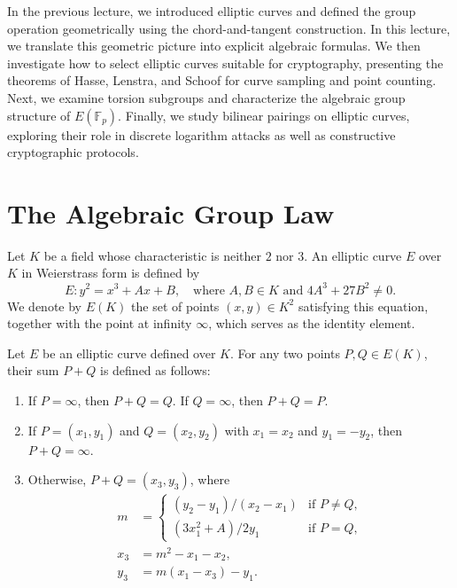 
In the previous lecture, we introduced elliptic curves and defined the group operation geometrically using the chord-and-tangent construction.
In this lecture, we translate this geometric picture into explicit algebraic formulas.
We then investigate how to select elliptic curves suitable for cryptography, presenting the theorems of Hasse, Lenstra, and Schoof for curve sampling and point counting.
Next, we examine torsion subgroups and characterize the algebraic group structure of \(E(\mathbb{F}_p)\).
Finally, we study bilinear pairings on elliptic curves, exploring their role in discrete logarithm attacks as well as constructive cryptographic protocols.

\section*{The Algebraic Group Law}

Let \(K\) be a field whose characteristic is neither \(2\) nor \(3\).
An elliptic curve \(E\) over \(K\) in Weierstrass form is defined by
\[
    E \colon y^2 = x^3 + Ax + B, \quad \text{where } A, B \in K \text{ and } 4A^3 + 27B^2 \neq 0.
\]
We denote by \(E(K)\) the set of points \((x, y) \in K^2\) satisfying this equation, together with the point at infinity \(\infty\), which serves as the identity element.

\begin{definition}\label{def:algebraic-group-op}
    Let \(E\) be an elliptic curve defined over \(K\).
    For any two points \(P, Q \in E(K)\), their sum \(P + Q\) is defined as follows:
    \begin{enumerate}
        \item If \(P = \infty\), then \(P + Q = Q\). If \(Q = \infty\), then \(P + Q = P\).
        \item If \(P = (x_1, y_1)\) and \(Q = (x_2, y_2)\) with \(x_1 = x_2\) and \(y_1 = -y_2\), then \(P + Q = \infty\).
        \item Otherwise, \(P + Q = (x_3, y_3)\), where
        \begin{align*}
            m &=
            \begin{cases}
                (y_2 - y_1) / (x_2 - x_1) & \text{if } P \neq Q, \\
                (3x_1^2 + A) / 2y_1 & \text{if } P = Q,
            \end{cases} \\
            x_3 &= m^2 - x_1 - x_2, \\
            y_3 &= m(x_1 - x_3) - y_1.
        \end{align*}
    \end{enumerate}
\end{definition}

